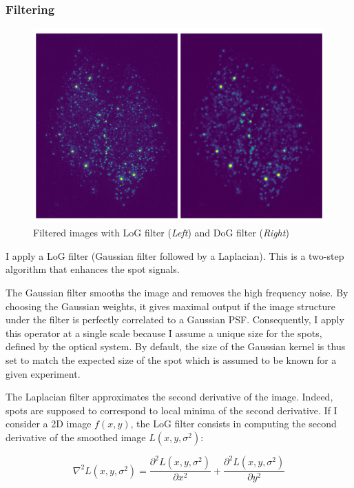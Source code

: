 \subsubsection{Filtering}

\begin{figure}[]
    \centering
    \includegraphics[width=1\textwidth]{figures/chapter2/filter_background}
    \caption[Filtered images with LoG and DoG filters]{Filtered images with LoG filter (\textit{Left}) and DoG filter (\textit{Right})}
    \label{fig:filters_detection}
\end{figure}

I apply a \ac{LoG} filter (Gaussian filter followed by a Laplacian).
This is a two-step algorithm that enhances the spot signals.

The Gaussian filter smooths the image and removes the high frequency noise.
By choosing the Gaussian weights, it gives maximal output if the image structure under the filter is perfectly correlated to a Gaussian \ac{PSF}.
Consequently, I apply this operator at a single scale because I assume a unique size for the spots, defined by the optical system.
By default, the size of the Gaussian kernel is thus set to match the expected size of the spot which is assumed to be known for a given experiment.

The Laplacian filter approximates the second derivative of the image.
Indeed, spots are supposed to correspond to local minima of the second derivative.
If I consider a 2D image $f(x,y)$, the \ac{LoG} filter consists in computing the second derivative of the smoothed image $L(x, y, \sigma^2)$:

\begin{equation}
	{\displaystyle \nabla^{2}L(x, y, \sigma^2) = \frac{\partial^{2}L(x, y, \sigma^2)}{\partial x^2} + \frac{\partial^{2}L(x, y, \sigma^2)}{\partial y^2}}
\end{equation}

